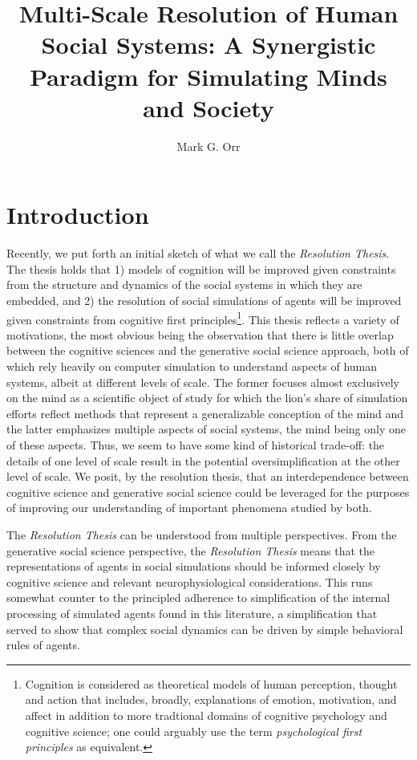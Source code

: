 \documentclass{article}
\title{Multi-Scale Resolution of Human Social Systems:  A Synergistic Paradigm for Simulating Minds and Society}
\author{Mark G. Orr}
\begin{document}
\maketitle

\section{Introduction}
Recently, we put forth an initial sketch of what we call the \textit{Resolution Thesis}\cite{orr2018brims}.  The thesis holds that 1) models of cognition will be improved given constraints from the structure and dynamics of the social systems in which they are embedded, and 2) the resolution of social simulations of agents will be improved given constraints from cognitive first principles\footnote{Cognition is  considered as theoretical models of human perception, thought and action that includes, broadly, explanations of emotion, motivation, and affect in addition to more tradtional domains of cognitive psychology and cognitive science; one could arguably use the term \textit{psychological first principles} as equivalent.}.  This thesis reflects a variety of motivations, the most obvious being the observation that there is little overlap between the cognitive sciences and the generative social science approach, both of which rely heavily on computer simulation to understand aspects of human systems, albeit at different levels of scale.  The former focuses almost exclusively on the mind as a scientific object of study for which the lion's share of simulation efforts reflect methods that represent a generalizable conception of the mind and the latter emphasizes multiple aspects of social systems, the mind being only one of these aspects. Thus, we seem to have some kind of historical  trade-off: the details of one level of scale result in the potential oversimplification at the other level of scale.  We posit, by the resolution thesis, that an interdependence between cognitive science and generative social science could be leveraged for the purposes of improving our understanding of important phenomena studied by both.    

The \textit{Resolution Thesis} can be understood from multiple perspectives.  From the generative social science perspective, the \textit{Resolution Thesis} means that the representations of agents in social simulations should be informed closely by cognitive science and relevant neurophysiological considerations.  This runs somewhat counter to the principled adherence to simplification of the internal processing of simulated agents found in this literature, a simplification that served to show that complex social dynamics can be driven by simple behavioral rules of agents.  
\end{document}
